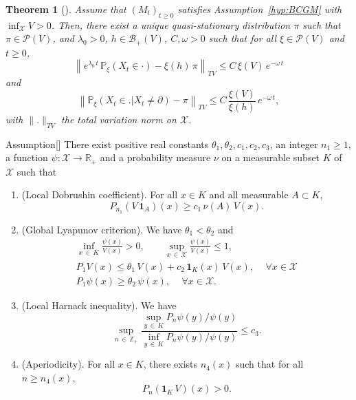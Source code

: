 \documentclass[10pt]{amsart}
\newtheorem{theo}{Theorem}[section]
\theoremstyle{definition}\newtheorem{defi}[theo]{Definition}\newtheorem{rema}[theo]{Remark}\newtheorem{exam}[theo]{Example}\newtheorem{exem}[theo]{Example}\newtheorem{nota}[theo]{Notation}
\newcommand{\PP}{\mathbb{P}}
\newcommand{\RR}{\mathbb{R}}
\newcommand{\ZZ}{\mathbb{Z}}
\newcommand{\clX}{\mathcal{X}}
\newcommand{\clB}{\mathcal{B}}
\newcommand{\clP}{\mathcal{P}}
\newcommand{\1}{\mathbf{1}}
\newcommand*{\Genumi}{\renewcommand*{\theenumi}{G\arabic{enumi}}}
\let\oldforall\forall
\renewcommand*{\forall}{\mathrel{\oldforall}}
\begin{document}
\begin{theo}[{\cite[Theorem~5.1]{BCGM}}]\label{th:BCGM}
Assume that $(M_t)_{t\geq 0}$ satisfies Assumption~\ref{hyp:BCGM} with $\inf_\clX V>0$. Then, there exist a unique quasi-stationary distribution $\pi$ such that $\pi\in\clP(V)$, and $\lambda_0>0$, $h\in\clB_+(V)$, $C,\omega>0$ such that for all $\xi\in\clP(V)$ and $t\geq 0$,
\[
\left\lVert e^{\lambda_0 \,t}\,\PP_\xi(X_t\in \cdot)-\xi(h)\,\pi\right\rVert_{TV}\leq C\,\xi(V)\,e^{-\omega\,t}
\]
and
\[
\left\lVert\PP_\xi(X_t\in. | X_t\neq \partial)-\pi\right\rVert_{TV}\leq C\,\frac{\xi(V)}{\xi(h)}\,e^{-\omega\,t},
\]
with $\lVert.\rVert_{TV}$ the total variation norm on $\clX$.
\end{theo}



\begin{enonce}{Assumption}[{\cite[Condition~(G) (including Remark~2.2)]{CV20}}]\label{hyp:CV20}
There exist positive real constants $\theta_1, \theta_2, c_1, c_2, c_3$, an integer $n_1\geq 1$, a function $\psi:\clX \to \RR_+$ and a probability measure $\nu$ on a measurable subset $K$ of $\clX$ such that
\begin{enumerate}\Genumi
\item\label{AssumpG1} (Local Dobrushin coefficient). For all $x \in K$ and all measurable $A\subset K$,
\[
P_{n_1}(V\,\1_A)(x)\geq c_1\,\nu(A)\,V(x).
\]
\item\label{AssumpG2} (Global Lyapunov criterion). We have $\theta_1<\theta_2$ and
\begin{gather*}
\inf_{x\,\in\,K} \frac{\psi(x)}{V(x)}>0, \qquad \sup_{x\,\in\,\clX} \frac{\psi(x)}{V(x)}\leq 1,
\\
P_1 V(x) \leq \theta_1 \, V(x) + c_2\,\1_K(x)\,V(x),\, \quad \forall x\in \clX
\\
P_1 \psi(x) \geq \theta_2 \, \psi(x),\, \quad \forall x\in \clX.
\end{gather*}
\item\label{AssumpG3} (Local Harnack inequality). We have
\[
\sup_{n\,\in\,\ZZ_+}\frac{\sup_{y\,\in\,K}P_n \psi(y)/\psi(y)}{\inf_{y\,\in\,K}P_n \psi(y)/\psi(y)} \leq c_3.
\]

\item\label{AssumpG4} (Aperiodicity). For all $x\in K$, there exists $n_4(x)$ such that for all $n\geq n_4(x)$,
\[
P_n(\1_K\,V)(x)>0.
\]
\end{enumerate}
\end{enonce}
\end{document}

